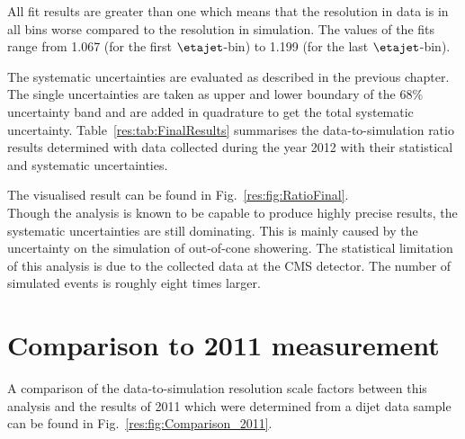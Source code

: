 All fit results are greater than one which means that the resolution in data is in all bins worse compared to the resolution in simulation.
The values of the fits range from 1.067 (for the first $\etajet$-bin) to 1.199 (for the last $\etajet$-bin). 

The systematic uncertainties are evaluated as described in the previous chapter. 
The single uncertainties are taken as upper and lower boundary of the 68\% uncertainty band and are added in quadrature to get the total systematic uncertainty.
Table~\ref{res:tab:FinalResults} summarises the data-to-simulation ratio results determined with data collected during the year 2012 with their statistical and systematic uncertainties.
\renewcommand{\arraystretch}{1.5}
\begin{table}[t]
\centering
\caption{Data-to-simulation resolution scale factors \rhores with statistical and systematic uncertainties.}
\label{res:tab:FinalResults}
\large{
}
\end{table}  
The visualised result can be found in Fig.~\ref{res:fig:RatioFinal}.\\




Though the \GAMJET analysis is known to be capable to produce highly precise results, the systematic uncertainties are still dominating. 
This is mainly caused by the uncertainty on the simulation of out-of-cone showering.
The statistical limitation of this analysis is due to the collected data at the CMS detector.
The number of simulated events is roughly eight times larger.

 
\section{Comparison to 2011 measurement}
\label{res:sec:comparison_2010}
A comparison of the data-to-simulation resolution scale factors \rhores between this analysis and the results of 2011 which were determined from a dijet data sample~\cite{bib:Matthias_Thesis} can be found in Fig.~\ref{res:fig:Comparison_2011}.

